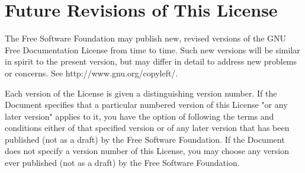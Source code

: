     \section{Future Revisions of This License}

    The Free Software Foundation may publish new, revised versions
    of the GNU Free Documentation License from time to time.  Such new
    versions will be similar in spirit to the present version, but may
    differ in detail to address new problems or concerns. See
    http://www.gnu.org/copyleft/.

    Each version of the License is given a distinguishing version number.
    If the Document specifies that a particular numbered version of this
    License "or any later version" applies to it, you have the option of
    following the terms and conditions either of that specified version or
    of any later version that has been published (not as a draft) by the
    Free Software Foundation.  If the Document does not specify a version
    number of this License, you may choose any version ever published (not
    as a draft) by the Free Software Foundation.

\endgroup
